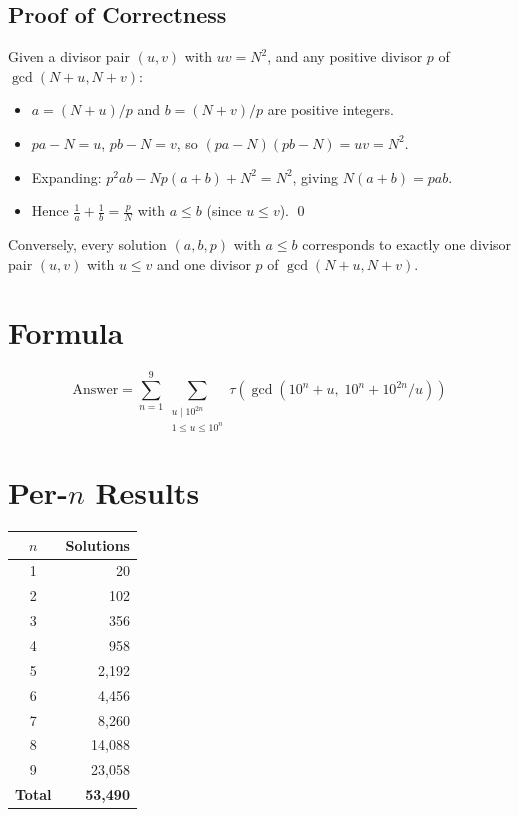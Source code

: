 \documentclass[12pt,a4paper]{article}
\begin{document}
\subsection{Proof of Correctness}

Given a divisor pair $(u, v)$ with $uv = N^2$, and any positive divisor $p$ of $\gcd(N+u, N+v)$:
\begin{itemize}
    \item $a = (N+u)/p$ and $b = (N+v)/p$ are positive integers.
    \item $pa - N = u$, $pb - N = v$, so $(pa - N)(pb - N) = uv = N^2$.
    \item Expanding: $p^2ab - Np(a+b) + N^2 = N^2$, giving $N(a+b) = pab$.
    \item Hence $\frac{1}{a} + \frac{1}{b} = \frac{p}{N}$ with $a \le b$ (since $u \le v$). \qed
\end{itemize}

Conversely, every solution $(a,b,p)$ with $a \le b$ corresponds to exactly one divisor pair $(u,v)$ with $u \le v$ and one divisor $p$ of $\gcd(N+u, N+v)$.

\section{Formula}

\[
\text{Answer} = \sum_{n=1}^{9} \sum_{\substack{u \mid 10^{2n} \\ 1 \le u \le 10^n}} \tau\!\left(\gcd(10^n + u,\; 10^n + 10^{2n}/u)\right)
\]

\section{Per-$n$ Results}

\begin{center}
\begin{tabular}{|c|r|}
\hline
$n$ & Solutions \\
\hline
1 & 20 \\
2 & 102 \\
3 & 356 \\
4 & 958 \\
5 & 2{,}192 \\
6 & 4{,}456 \\
7 & 8{,}260 \\
8 & 14{,}088 \\
9 & 23{,}058 \\
\hline
\textbf{Total} & \textbf{53{,}490} \\
\hline
\end{tabular}
\end{center}
\end{document}
